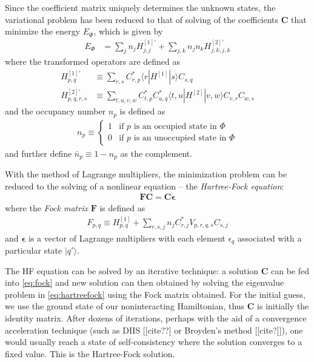 Since the coefficient matrix uniquely determines the unknown states, the variational problem has been reduced to that of solving of the coefficients $\bm C$ that minimize the energy $E_{\Phi}$, which is given by
\begin{align}
  E_{\Phi} &= \sum_{j} n_j H^{[1] \prime}_{j, j} + \sum_{j, k} n_j n_k H^{[2] \prime}_{j, k, j, k} \label{eq:hfenergy}
\end{align}
where the transformed operators are defined as
\begin{align}
  H^{[1] \prime}_{p, q} &\equiv \sum_{r, s} C_{r, p}^* \langle r | H^{[1]} | s \rangle C_{s, q}^{} \label{eq:hftransform1} \\
  H^{[2] \prime}_{p, q, r, s} &\equiv \sum_{t, u, v, w} C_{t, p}^* C_{u, q}^* \langle t, u | H^{[2]} | v, w \rangle C_{v, r}^{} C_{w, s}^{} \label{eq:hftransform2}
\end{align}
and the occupancy number $n_p$ is defined as
\begin{align}
  n_p \equiv \begin{cases}
    1 & \text{if $p$ is an occupied state in $\Phi$} \\
    0 & \text{if $p$ is an unoccupied state in $\Phi$}
  \end{cases}
\end{align}
and further define $\bar n_p \equiv 1 - n_p$ as the complement.

With the method of Lagrange multipliers, the minimization problem can be reduced to the solving of a nonlinear equation -- the \textit{Hartree-Fock equation}:
\begin{align} \label{eq:hartreefock}
  \bm F \bm C = \bm C \bm \epsilon
\end{align}
where the \textit{Fock matrix} $\bm F$ is defined as
\begin{align} \label{eq:fock}
  F_{p, q} \equiv H_{p, q}^{[1]} + \sum_{r, s, j} n_j C_{r, j}^* V_{p, r, q, s}^{} C_{s, j}^{}
\end{align}
and $\bm \epsilon$ is a vector of Lagrange multipliers with each element $\epsilon_q$ associated with a particular state $|q'\rangle$.

The HF equation can be solved by an iterative technique: a solution $\bm C$ can be fed into \eqref{eq:fock} and new solution can then obtained by solving the eigenvalue problem in \eqref{eq:hartreefock} using the Fock matrix obtained.  For the initial guess, we use the ground state of our noninteracting Hamiltonian, thus $\bm C$ is initially the identity matrix.  After dozens of iterations, perhaps with the aid of a convergence acceleration technique (such as DIIS [[cite??] or Broyden's method [[cite?]]), one would usually reach a state of self-consistency where the solution converges to a fixed value.  This is the Hartree-Fock solution.


